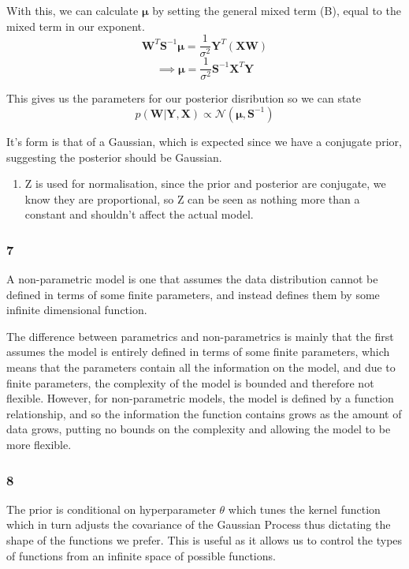 \documentclass[11pt]{article}
\providecommand{\tightlist}{%
      \setlength{\itemsep}{0pt}\setlength{\parskip}{0pt}}
\begin{document}
With this, we can calculate \(\boldsymbol{\mu}\) by setting the general
mixed term (B), equal to the mixed term in our exponent.
\[\boldsymbol{W}^T\boldsymbol{S}^{-1}\boldsymbol{\mu} = \frac{1}{\sigma^2}\boldsymbol{Y}^T(\boldsymbol{XW})\]
\[\implies \boldsymbol{\mu} = \frac{1}{\sigma^2}\boldsymbol{S}^{-1}\boldsymbol{X}^T\boldsymbol{Y}\]

This gives us the parameters for our posterior disribution so we can
state
\[p(\boldsymbol{W}|\boldsymbol{Y}, \boldsymbol{X}) \propto \mathcal{N}(\boldsymbol{\mu},\boldsymbol{S}^{-1}) \]

It's form is that of a Gaussian, which is expected since we have a
conjugate prior, suggesting the posterior should be Gaussian.

\begin{enumerate}
\def\labelenumi{\alph{enumi})}
\setcounter{enumi}{2}
\tightlist
\item
  Z is used for normalisation, since the prior and posterior are
  conjugate, we know they are proportional, so Z can be seen as nothing
  more than a constant and shouldn't affect the actual model.
\end{enumerate}

    \subsubsection*{7}\label{section}

A non-parametric model is one that assumes the data distribution cannot
be defined in terms of some finite parameters, and instead defines them
by some infinite dimensional function.

The difference between parametrics and non-parametrics is mainly that
the first assumes the model is entirely defined in terms of some finite
parameters, which means that the parameters contain all the information
on the model, and due to finite parameters, the complexity of the model
is bounded and therefore not flexible. However, for non-parametric
models, the model is defined by a function relationship, and so the
information the function contains grows as the amount of data grows,
putting no bounds on the complexity and allowing the model to be more
flexible.

    \subsubsection*{8}\label{section}

The prior is conditional on hyperparameter \(\theta\) which tunes the
kernel function which in turn adjusts the covariance of the Gaussian
Process thus dictating the shape of the functions we prefer. This is
useful as it allows us to control the types of functions from an
infinite space of possible functions.
\end{document}
